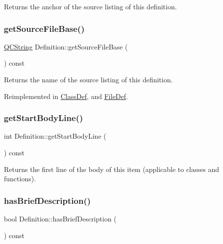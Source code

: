 Returns the anchor of the source listing of this definition. \mbox{\label{class_definition_abdb114d4da6048e834ccae02393790df}} 
\subsubsection{\texorpdfstring{getSourceFileBase()}{getSourceFileBase()}}
{\footnotesize\ttfamily \mbox{\hyperlink{class_q_c_string}{Q\+C\+String}} Definition\+::get\+Source\+File\+Base (\begin{DoxyParamCaption}{ }\end{DoxyParamCaption}) const\hspace{0.3cm}{\ttfamily [virtual]}}

Returns the name of the source listing of this definition. 

Reimplemented in \mbox{\hyperlink{class_class_def_a35e351146e4ce259ee129551a167f0bd}{Class\+Def}}, and \mbox{\hyperlink{class_file_def_a9ddb22ec1cbae4e2b8d192c455103046}{File\+Def}}.

\mbox{\label{class_definition_a5bf4e2d03d7cee134bcd77392cba0e7b}} 
\subsubsection{\texorpdfstring{getStartBodyLine()}{getStartBodyLine()}}
{\footnotesize\ttfamily int Definition\+::get\+Start\+Body\+Line (\begin{DoxyParamCaption}{ }\end{DoxyParamCaption}) const}

Returns the first line of the body of this item (applicable to classes and functions). \mbox{\label{class_definition_a1a4519f06f38904ab1914ecd641c4a36}} 
\subsubsection{\texorpdfstring{hasBriefDescription()}{hasBriefDescription()}}
{\footnotesize\ttfamily bool Definition\+::has\+Brief\+Description (\begin{DoxyParamCaption}{ }\end{DoxyParamCaption}) const}

